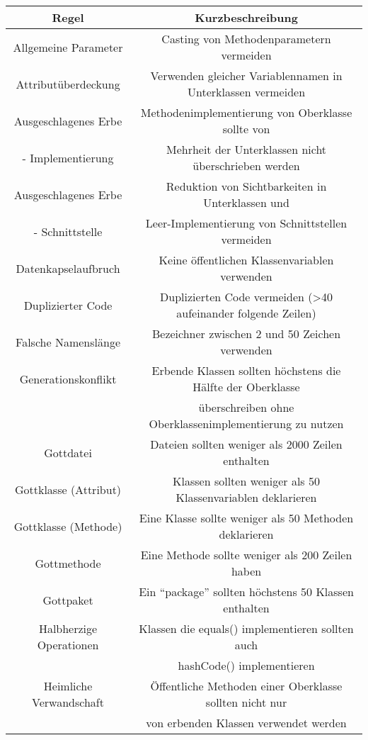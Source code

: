 \documentclass[da,ngerman]{stthesis}
\begin{document}
				\begin{center}
					\tabulinesep=1.5mm
					\begin{longtabu}{|c|c|}
						\hline
  						\textbf{Regel} & \textbf{Kurzbeschreibung}\\
  						\hline
						Allgemeine Parameter & Casting von Methodenparametern vermeiden \\
						\hline
						Attributüberdeckung & Verwenden gleicher Variablennamen in Unterklassen vermeiden \\
						\hline
						Ausgeschlagenes Erbe & Methodenimplementierung von Oberklasse sollte von \\ - Implementierung & Mehrheit der Unterklassen nicht überschrieben werden \\
						\hline
						Ausgeschlagenes Erbe & Reduktion von Sichtbarkeiten in Unterklassen und \\ - Schnittstelle & Leer-Implementierung von Schnittstellen vermeiden \\
						\hline
						Datenkapselaufbruch & Keine öffentlichen Klassenvariablen verwenden \\
						\hline
						Duplizierter Code & Duplizierten Code vermeiden (>40 aufeinander folgende Zeilen) \\
						\hline
						Falsche Namenslänge & Bezeichner zwischen 2 und 50 Zeichen verwenden \\
						\hline
						Generationskonflikt & Erbende Klassen sollten höchstens die Hälfte der Oberklasse \\ & überschreiben ohne Oberklassenimplementierung zu nutzen \\
						\hline
						Gottdatei & Dateien sollten weniger als 2000 Zeilen enthalten \\
						\hline
						Gottklasse (Attribut) & Klassen sollten weniger als 50 Klassenvariablen deklarieren \\
						\hline
						Gottklasse (Methode) & Eine Klasse sollte weniger als 50 Methoden deklarieren \\
						\hline
						Gottmethode & Eine Methode sollte weniger als 200 Zeilen haben \\
						\hline
						Gottpaket & Ein "`package"' sollten höchstens 50 Klassen enthalten \\
						\hline
						Halbherzige Operationen & Klassen die equals() implementieren sollten auch \\ &  hashCode() implementieren \\
						\hline
						Heimliche Verwandschaft & Öffentliche Methoden einer Oberklasse sollten nicht nur \\ & von erbenden Klassen verwendet werden \\

\end{longtabu}
\end{center}
\end{document}
